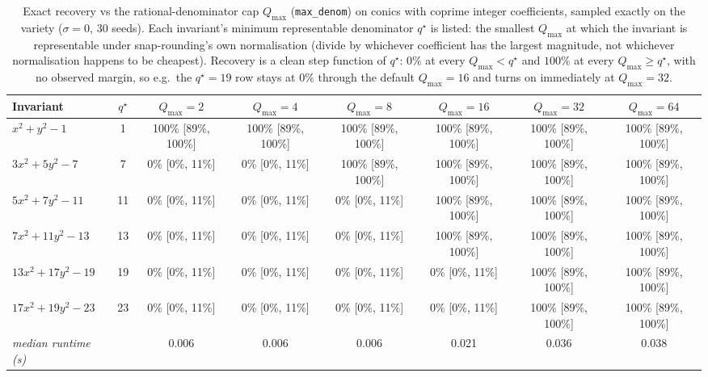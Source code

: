 \documentclass{article}
\begin{document}
\begin{table}[ht]
\centering
\caption{Exact recovery vs the rational-denominator cap $Q_{\max}$ (\texttt{max\_denom}) on conics with coprime integer coefficients, sampled exactly on the variety ($\sigma=0$, 30 seeds). Each invariant's minimum representable denominator $q^\star$ is listed: the smallest $Q_{\max}$ at which the invariant is representable under snap-rounding's own normalisation (divide by whichever coefficient has the largest magnitude, not whichever normalisation happens to be cheapest). Recovery is a clean step function of $q^\star$: $0\%$ at every $Q_{\max}<q^\star$ and $100\%$ at every $Q_{\max}\ge q^\star$, with no observed margin, so e.g.\ the $q^\star=19$ row stays at $0\%$ through the default $Q_{\max}=16$ and turns on immediately at $Q_{\max}=32$.}
\label{tab:qmax-recovery}
\begin{tabular}{l c cccccc}
\toprule
\textbf{Invariant} & $q^\star$ & $Q_{\max}{=}2$ & $Q_{\max}{=}4$ & $Q_{\max}{=}8$ & $Q_{\max}{=}16$ & $Q_{\max}{=}32$ & $Q_{\max}{=}64$ \\
\midrule
$x^2+y^2-1$ & 1 & 100\% [89\%, 100\%] & 100\% [89\%, 100\%] & 100\% [89\%, 100\%] & 100\% [89\%, 100\%] & 100\% [89\%, 100\%] & 100\% [89\%, 100\%] \\
$3x^2+5y^2-7$ & 7 & 0\% [0\%, 11\%] & 0\% [0\%, 11\%] & 100\% [89\%, 100\%] & 100\% [89\%, 100\%] & 100\% [89\%, 100\%] & 100\% [89\%, 100\%] \\
$5x^2+7y^2-11$ & 11 & 0\% [0\%, 11\%] & 0\% [0\%, 11\%] & 0\% [0\%, 11\%] & 100\% [89\%, 100\%] & 100\% [89\%, 100\%] & 100\% [89\%, 100\%] \\
$7x^2+11y^2-13$ & 13 & 0\% [0\%, 11\%] & 0\% [0\%, 11\%] & 0\% [0\%, 11\%] & 100\% [89\%, 100\%] & 100\% [89\%, 100\%] & 100\% [89\%, 100\%] \\
$13x^2+17y^2-19$ & 19 & 0\% [0\%, 11\%] & 0\% [0\%, 11\%] & 0\% [0\%, 11\%] & 0\% [0\%, 11\%] & 100\% [89\%, 100\%] & 100\% [89\%, 100\%] \\
$17x^2+19y^2-23$ & 23 & 0\% [0\%, 11\%] & 0\% [0\%, 11\%] & 0\% [0\%, 11\%] & 0\% [0\%, 11\%] & 100\% [89\%, 100\%] & 100\% [89\%, 100\%] \\
\midrule
\emph{median runtime (s)} & & 0.006 & 0.006 & 0.006 & 0.021 & 0.036 & 0.038 \\
\bottomrule
\end{tabular}
\end{table}
\end{document}
